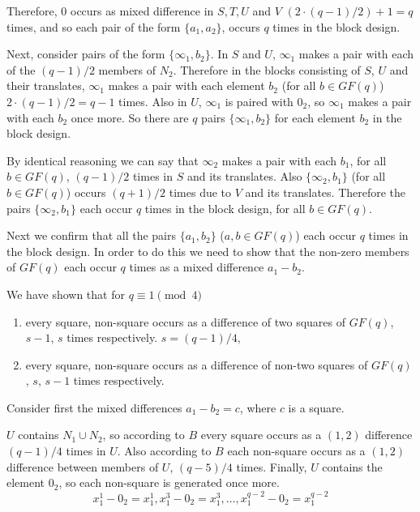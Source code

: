\documentclass[
  11pt,
  a4paper]{book}\usepackage[]{graphicx}\usepackage[]{xcolor}
\begin{document}
Therefore, 0 occurs as mixed difference in $S, T, U$ and $V$
$(2\cdot (q - 1)/2) + 1 = q$ times, and so each pair of the
form $\{a_1, a_2\}$, occurs $q$ times in the block design.

Next, consider pairs of the form $\{\infty _1, b_2\}$. In
$S$ and $U$, $\infty _1$ makes a pair with each of the
$(q - 1)/2$ members of $N_2$.  Therefore in the blocks
consisting of $S$, $U$ and their translates, $\infty _1$
makes a pair with each element $b_2$ (for all $b \in GF(q)$)
$2 \cdot (q - 1)/2 = q - 1$ times. Also in $U$, $\infty _1$ is
paired with $0_2$, so $\infty _1$ makes a pair with each
$b_2$ once more. So there are $q$ pairs $\{\infty _1, b_2\}$
for each element $b_2$ in the block design.

By identical reasoning we can say that $\infty _2$ makes a
pair with each $b_1$, for all $b \in GF(q)$, $(q - 1)/2$ times
in $S$ and its translates. Also $\{\infty _2, b_1\}$ (for all
$b \in GF(q)$) occurs $(q + 1)/2$ times due to $V$ and its
translates.  Therefore the pairs $\{\infty _2, b_1 \}$ each
occur $q$ times in the block design, for all $b \in GF(q)$.

Next we confirm that all the pairs
$\{a_1, b_2\}$ ($a, b \in GF(q)$) each occur $q$ times in the
block design. In order to do this we need to show that the
non-zero members of $GF(q)$ each occur $q$ times as a mixed
difference $a_1 - b_2$.

We have shown that for $q \equiv 1\pmod 4$
\begin{enumerate}
  \item{every square, non-square occurs as a difference of two
      squares of $GF(q)$, $s - 1$, $s$ times respectively.
      $s = (q - 1)/4$,}
  \item{every square, non-square occurs as a difference of
      non-two squares of $GF(q)$, $s$, $s - 1$ times
      respectively.}
\end{enumerate}

Consider first the mixed differences $a_1 - b_2 = c$, where
$c$ is a square.

$U$ contains $N_1 \cup N_2$, so according to $B$ every
square occurs as a $(1, 2)$ difference $(q - 1)/4$ times in
$U$. Also according to $B$ each non-square occurs as a $(1, 2)$
difference between members of $U$, $(q - 5)/4$ times.
Finally, $U$ contains the element $0_2$, so each non-square
is generated once more.
\begin{equation}
x_1^1 - 0_2 = x^1_1, x_1^3 - 0_2 = x_1^3, \ldots, x_1^{q - 2} - 0_2 = x_1^{q - 2}
\end{equation}
\end{document}
